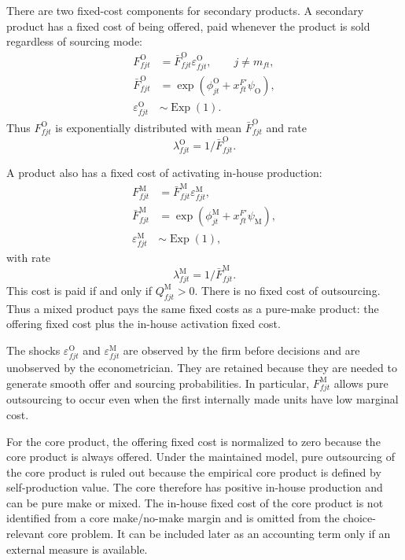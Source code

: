 \documentclass[11pt,a4paper]{article}
\newcommand{\M}{\mathrm{M}}
\newcommand{\OFC}{\mathrm{O}}
\begin{document}
There are two fixed-cost components for secondary products. A secondary product has a fixed cost of being offered, paid whenever the product is sold regardless of sourcing mode:
\begin{align}
    F^{\OFC}_{fjt}&=\bar F^{\OFC}_{fjt}\varepsilon^{\OFC}_{fjt},
    \qquad j\neq m_{ft},
    \label{eq:offer_fixed_cost}\\
    \bar F^{\OFC}_{fjt}&=\exp\left(\phi^{\OFC}_{jt}+x^{F\prime}_{ft}\psi_{\OFC}\right),
    \label{eq:offer_fixed_mean}\\
    \varepsilon^{\OFC}_{fjt}&\sim \operatorname{Exp}(1).
    \label{eq:offer_fixed_shock}
\end{align}
Thus $F^{\OFC}_{fjt}$ is exponentially distributed with mean $\bar F^{\OFC}_{fjt}$ and rate
\begin{equation}
    \lambda^{\OFC}_{fjt}=1/\bar F^{\OFC}_{fjt}.
    \label{eq:offer_rate}
\end{equation}

A product also has a fixed cost of activating in-house production:
\begin{align}
    F^{\M}_{fjt}&=\bar F^{\M}_{fjt}\varepsilon^{\M}_{fjt},
    \label{eq:make_fixed_cost}\\
    \bar F^{\M}_{fjt}&=\exp\left(\phi^{\M}_{jt}+x^{F\prime}_{ft}\psi_{\M}\right),
    \label{eq:make_fixed_mean}\\
    \varepsilon^{\M}_{fjt}&\sim \operatorname{Exp}(1),
    \label{eq:make_fixed_shock}
\end{align}
with rate
\begin{equation}
    \lambda^{\M}_{fjt}=1/\bar F^{\M}_{fjt}.
    \label{eq:make_rate}
\end{equation}
This cost is paid if and only if $Q^{\M}_{fjt}>0$. There is no fixed cost of outsourcing. Thus a mixed product pays the same fixed costs as a pure-make product: the offering fixed cost plus the in-house activation fixed cost.

The shocks $\varepsilon^{\OFC}_{fjt}$ and $\varepsilon^{\M}_{fjt}$ are observed by the firm before decisions and are unobserved by the econometrician. They are retained because they are needed to generate smooth offer and sourcing probabilities. In particular, $F^{\M}_{fjt}$ allows pure outsourcing to occur even when the first internally made units have low marginal cost.

For the core product, the offering fixed cost is normalized to zero because the core product is always offered. Under the maintained model, pure outsourcing of the core product is ruled out because the empirical core product is defined by self-production value. The core therefore has positive in-house production and can be pure make or mixed. The in-house fixed cost of the core product is not identified from a core make/no-make margin and is omitted from the choice-relevant core problem. It can be included later as an accounting term only if an external measure is available.
\end{document}
